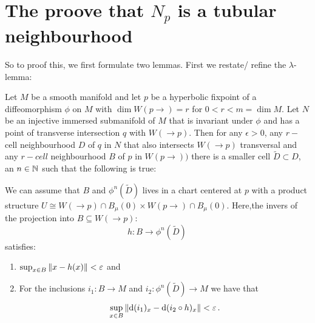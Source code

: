 \section{The proove that $N_p$ is a tubular neighbourhood} \label{section: Np tubular neighbourhood proove}
So to proof this, we first formulate two lemmas. First we restate/ refine the $\lambda$-lemma: 
\begin{lemma} 
	Let $ M$ be a smooth manifold and let $p$ be a hyperbolic fixpoint of a diffeomorphism $\phi$ on $M$ with $\dim W(p \to)=r$ for ${0<r<m=\dim M}$. Let $N$ be an injective immersed submanifold of $M$ that is invariant under $\phi$ and has a point of transverse intersection $q$ with $W(\to p)$. Then for any $\epsilon>0$, any $r-$cell neighbourhood $D$ of $q$ in $N$ that also intersects $W(\to p)$ transversal and any $r-cell$ neighbourhood $B$ of $p$ in $W(p\to))$ there is a smaller cell $\tilde{D}\subset D$, an $n\in \mathbb{N}$ such that the following is true:
	
	We can assume that $B$ and $\phi^n(\tilde{D})$ lives in a chart centered at $p$ with a product structure $U\cong W(\to p)\cap B_\mu(0)\times W(p\to)\cap B_\mu(0)$. Here,the invers of the projection into $B\subseteq W(\to p)$:
	\begin{equation*}
		h: B\to \phi^n(\tilde{D})\, 
	\end{equation*}satisfies:
	\begin{enumerate}
		\item $\sup_{x \in B}\left\lVert x-h(x)\right\rVert<\varepsilon$ and
		\item For the inclusions  $i_1:B\to M$ and $i_2:\phi^n(\tilde{D})\to M$ we have that 
		\begin{equation*}
			\sup_{x \in B}\left\lVert\mathop{}\!\mathrm{d}(i_1)_x-\mathop{}\!\mathrm{d}(i_2\circ h)_x\right\rVert<\varepsilon\, .
		\end{equation*}
	\end{enumerate}
\end{lemma}
